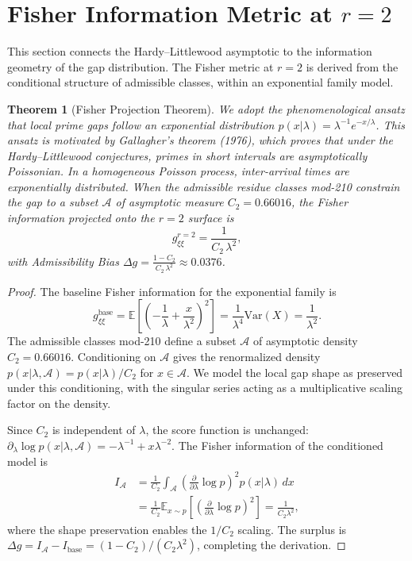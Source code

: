 \documentclass[12pt]{article}
\newtheorem{theorem}{Theorem}[section]
\begin{document}
\section{Fisher Information Metric at $r=2$}

This section connects the Hardy--Littlewood asymptotic to the information
geometry of the gap distribution. The Fisher metric at $r=2$ is derived from
the conditional structure of admissible classes, within an exponential
family model.

\begin{theorem}[Fisher Projection Theorem]
We adopt the phenomenological ansatz that local prime gaps follow an exponential
distribution $p(x|\lambda) = \lambda^{-1} e^{-x/\lambda}$. This ansatz is motivated
by Gallagher's theorem (1976), which proves that under the Hardy--Littlewood
conjectures, primes in short intervals are asymptotically Poissonian. In a
homogeneous Poisson process, inter-arrival times are exponentially distributed.
When the admissible residue classes mod-210 constrain the gap to a subset
$\mathcal{A}$ of asymptotic measure $C_2 = 0.66016$, the Fisher information
projected onto the $r=2$ surface is
\begin{equation}
  g_{\xi\xi}^{r=2} = \frac{1}{C_2\,\lambda^2},
  \label{eq:fisher_r2}
\end{equation}
with Admissibility Bias $\Delta g = \frac{1 - C_2}{C_2\,\lambda^2} \approx 0.0376$.
\end{theorem}
\label{thm:fisher}

\begin{proof}
The baseline Fisher information for the exponential family is
\[
  g_{\xi\xi}^{\text{base}} = \mathbb{E}\!\left[\left(-\frac{1}{\lambda} + \frac{x}{\lambda^2}\right)^2\right]
  = \frac{1}{\lambda^4}\text{Var}(X) = \frac{1}{\lambda^2}.
\]
The admissible classes mod-210 define a subset $\mathcal{A}$ of asymptotic density
$C_2 = 0.66016$. Conditioning on $\mathcal{A}$ gives the renormalized density
$p(x|\lambda,\mathcal{A}) = p(x|\lambda)/C_2$ for $x \in \mathcal{A}$. We model
the local gap shape as preserved under this conditioning, with the singular series
acting as a multiplicative scaling factor on the density.

Since $C_2$ is independent of $\lambda$, the score function is unchanged:
$\partial_\lambda \log p(x|\lambda,\mathcal{A}) = -\lambda^{-1} + x\lambda^{-2}$.
The Fisher information of the conditioned model is
\begin{align*}
  I_{\mathcal{A}} &= \frac{1}{C_2} \int_{\mathcal{A}}
    \left(\frac{\partial}{\partial\lambda}\log p\right)^2 p(x|\lambda)\,dx \\
  &= \frac{1}{C_2} \mathbb{E}_{x \sim p}\!\left[\left(\frac{\partial}{\partial\lambda}
    \log p\right)^2\right] = \frac{1}{C_2\lambda^2},
\end{align*}
where the shape preservation enables the $1/C_2$ scaling. The surplus is
$\Delta g = I_{\mathcal{A}} - I_{\text{base}} = (1-C_2)/(C_2\lambda^2)$,
completing the derivation.
\end{proof}
\end{document}
